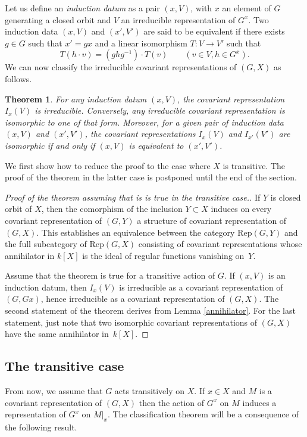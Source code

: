 \documentclass{amsart}
\newtheorem{theorem}{Theorem}
\theoremstyle{definition}
\begin{document}
Let us define an \textit{induction datum} as a pair $(x,V)$, with $x$ an element of $G$ generating a closed orbit and $V$ an irreducible representation of $G^x$. Two induction data $(x,V)$ and $(x',V')$ are said to be equivalent if there exists $g \in G$ such that $x' = gx$ and a linear isomorphism $T : V \to V'$ such that
    \begin{equation}\label{twist} T(h\cdot v) = (ghg^{-1})\cdot T(v) \qquad (v \in V, h \in G^{x}).\end{equation}
We can now classify the irreducible covariant representations of $(G,X)$ as follows.

\begin{theorem}\label{classification}
    For any induction datum $(x,V)$, the covariant representation $I_x(V)$ is irreducible. Conversely, any irreducible covariant representation is isomorphic to one of that form. Moreover, for a given pair of induction data $(x,V)$ and $(x',V')$, the covariant representations $I_x(V)$ and $I_{x'}(V')$ are isomorphic if and only if $(x,V)$ is equivalent to $(x',V')$.
\end{theorem}

We first show how to reduce the proof to the case where $X$ is transitive. The proof of the theorem in the latter case is postponed until the end of the section.

\begin{proof}[Proof of the theorem assuming that is is true in the transitive case.]
    If $Y$ is closed orbit of $X$, then the comorphism of the inclusion $Y\subset X$ induces on every covariant representation of $(G,Y)$ a structure of covariant representation of $(G,X)$. This establishes an equivalence between the category $\mathrm{Rep}(G,Y)$ and the full subcategory of $\mathrm{Rep}(G,X)$ consisting of covariant representations whose annihilator in $k[X]$ is the ideal of regular functions vanishing on~$Y$.
    
    Assume that the theorem is true for a transitive action of $G$. If $(x,V)$ is an induction datum, then $I_x(V)$ is irreducible as a covariant representation of $(G,Gx)$, hence irreducible as a covariant representation of $(G,X)$. The second statement of the theorem derives from Lemma \ref{annihilator}. For the last statement, just note that two isomorphic covariant representations of $(G,X)$ have the same annihilator in~$k[X]$.
\end{proof}

\subsection{The transitive case} From now, we assume that $G$ acts transitively on $X$. If $x \in X$ and $M$ is a covariant representation of $(G,X)$ then the action of $G^x$ on $M$ induces a representation of $G^x$ on $M|_x$. The classification theorem will be a consequence of the following result.
\end{document}
